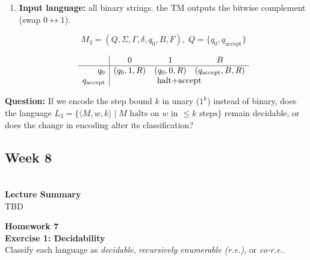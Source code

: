 \documentclass{article}
\theoremstyle{theorem}
\theoremstyle{definition}
\theoremstyle{remark}
\begin{document}
\begin{enumerate}
  \item \textbf{Input language:} all binary strings. the TM outputs the bitwise complement (swap \(0\leftrightarrow1\)).

        \[
          M_3 = (Q,\Sigma,\Gamma,\delta,q_0,B,F),\;
          Q=\{q_0,q_{\mathrm{accept}}\}
        \]

        \[
        \begin{array}{r|ccc}
                 & 0          & 1          & B \\ \hline
        q_0      & (q_0,1,R)  & (q_0,0,R)  & (q_{\mathrm{accept}},B,R)\\
        q_{\mathrm{accept}} & \multicolumn{3}{c}{\text{halt+accept}}\\
        \end{array}
        \]
\end{enumerate}

    \textbf{Question: }If we encode the step bound \(k\) in unary (\(1^{k}\)) instead of binary, does the language  
        \(L_{3} = \{\langle M,w,k\rangle \mid M \text{ halts on } w \text{ in } \le k \text{ steps}\}\)  
        remain decidable, or does the change in encoding alter its classification?  

\subsection{\textbf{Week 8}}\\
\textbf{Lecture Summary}\\
TBD

\textbf{Homework 7}\\
\textbf{Exercise 1: Decidability}\\
Classify each language as \emph{decidable}, \emph{recursively enumerable (r.e.)}, or \emph{co‑r.e.}. 
\end{document}
